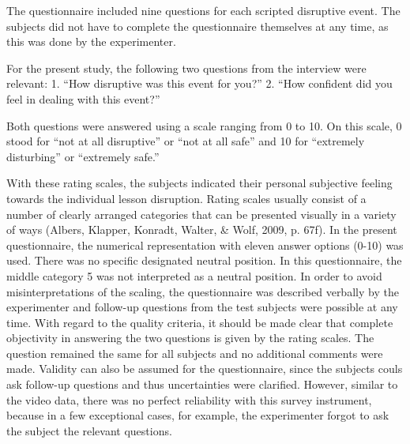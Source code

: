 \documentclass[
  man]{apa6}
\begin{document}
The questionnaire included nine questions for each scripted disruptive event. The subjects did not have to complete the questionnaire themselves at any time, as this was done by the experimenter.

For the present study, the following two questions from the interview were relevant:
1. ``How disruptive was this event for you?''
2. ``How confident did you feel in dealing with this event?''

Both questions were answered using a scale ranging from 0 to 10. On this scale, 0 stood for ``not at all disruptive'' or ``not at all safe'' and 10 for ``extremely disturbing'' or ``extremely safe.''

With these rating scales, the subjects indicated their personal subjective feeling towards the individual lesson disruption. Rating scales usually consist of a number of clearly arranged categories that can be presented visually in a variety of ways (Albers, Klapper, Konradt, Walter, \& Wolf, 2009, p. 67f). In the present questionnaire, the numerical representation with eleven answer options (0-10) was used. There was no specific designated neutral position. In this questionnaire, the middle category 5 was not interpreted as a neutral position. In order to avoid misinterpretations of the scaling, the questionnaire was described verbally by the experimenter and follow-up questions from the test subjects were possible at any time. With regard to the quality criteria, it should be made clear that complete objectivity in answering the two questions is given by the rating scales. The question remained the same for all subjects and no additional comments were made. Validity can also be assumed for the questionnaire, since the subjects couls ask follow-up questions and thus uncertainties were clarified. However, similar to the video data, there was no perfect reliability with this survey instrument, because in a few exceptional cases, for example, the experimenter forgot to ask the subject the relevant questions.
\end{document}
